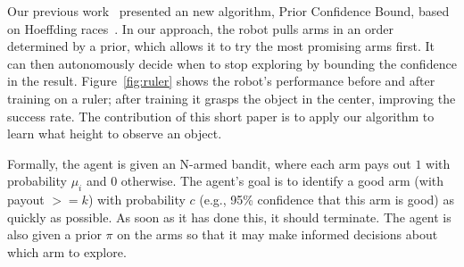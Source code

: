 \documentclass[conference,onecolumn]{IEEEtran}
\newcommand{\algorithmDTxt}{Prior Confidence Bound\xspace}
\begin{document}
Our previous work~\citep{oberlin15} presented an new algorithm,
\algorithmDTxt, based on Hoeffding races~\citep{maron93}. In our
approach, the robot pulls arms in an order determined by a prior,
which allows it to try the most promising arms first. It can then
autonomously decide when to stop exploring by bounding the confidence in the
result.  Figure~\ref{fig:ruler} shows the robot's performance before
and after training on a ruler; after training it grasps the object in
the center, improving the success rate.  The contribution of this
short paper is to apply our algorithm to learn what height to observe
an object.

Formally, the agent is given an N-armed bandit, where each arm pays
out $1$ with probability $\mu_i$ and $0$ otherwise.  The agent's goal
is to identify a good arm (with payout $>= k$) with probability $c$
(e.g., 95\% confidence that this arm is good) as quickly as possible.
As soon as it has done this, it should terminate.  The agent is also
given a prior $\pi$ on the arms so that it may make informed decisions
about which arm to explore.




\end{document}
